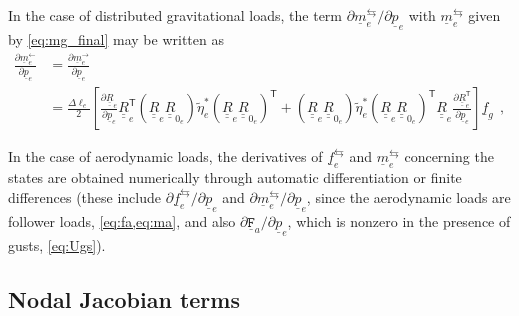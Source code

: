 \documentclass[12pt,a4paper,oneside,english]{abntex2} %
\newcommand{\fix}[1]{{\color{red}#1}}
\newcommand{\vect}[1]{\underline{#1}}
\newcommand{\del}[2]{\frac{\partial#1}{\partial#2}}
\def\tens#1{\underline{\underline{#1}}}
\def\til#1{\widetilde{#1}}
\def\lb{\left[}
\def\rb{\right]}
\def\lp{\left(}
\def\rp{\right)}
\def\T{\mathsf{T}}
\def\R{\tens{R}}
\def\etatilse{\til{\eta}_e^*}
\def\p{\vect{p}}
\def\f{\vect{f}}
\def\m{\vect{m}}
\def\Deltal{\Delta \ell_e}
\def\dlotwo{\frac{\Deltal}{2}}
\def\pe{\p_e}
\def\fe{\f_e}
\def\me{\m_e}
\def\Re{\R_{e}}
\def\ReT{\R_{e}^\T}
\def\Rze{\R_{0_e}}
\def\RRze{\lp\Re\Rze\rp}
\def\RRzeT{\RRze^\T}
\def\fg{\f_g}
\def\Fa{\mathtt{\vect{F}}_{a}}
\begin{document}
\begin{apendicesenv}
In the case of distributed gravitational loads, the term $\partial\me^\leftrightarrows/\partial\pe$ with $\me^\leftrightarrows$ given by \cref{eq:mg_final} may be written as
\begin{equation}
    \begin{aligned}
        \del{\me^\leftarrow}{\pe} &= \del{\me^\rightarrow}{\pe} 
        \nonumber \\
        &= \dlotwo\lb \del{\Re}{\pe}\ReT\RRze\etatilse\RRzeT + \RRze\etatilse\RRzeT\Re\del{\ReT}{\pe} \rb\fg \ \ ,
        \label{eq:dmgp}
    \end{aligned}
\end{equation}

In the case of aerodynamic loads, the derivatives of $\fe^\leftrightarrows$ and $\me^\leftrightarrows$ concerning the states are obtained numerically through automatic differentiation or finite differences \fix{(these include $\partial\fe^\leftrightarrows/\partial\pe$ and $\partial\me^\leftrightarrows/\partial\pe$, since the aerodynamic loads are follower loads, \cref{eq:fa,eq:ma}, and also $\partial\Fa/\partial\pe$, which is nonzero in the presence of gusts, \cref{eq:Ugs})}.

\subsection{Nodal Jacobian terms}


\end{apendicesenv}
\end{document}
